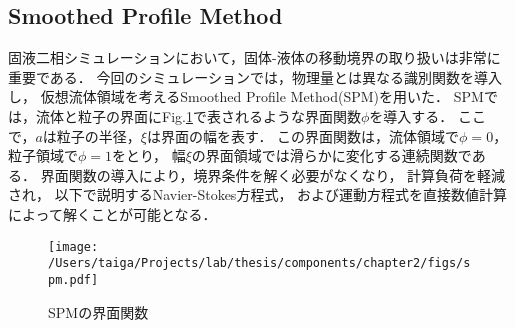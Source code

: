 \subsection{Smoothed Profile Method}
固液二相シミュレーションにおいて，固体-液体の移動境界の取り扱いは非常に重要である．
今回のシミュレーションでは，物理量とは異なる識別関数を導入し，
仮想流体領域を考えるSmoothed Profile Method(SPM)\cite{}を用いた．
SPMでは，流体と粒子の界面にFig.\ref{fig:spm}で表されるような界面関数$\phi$を導入する．
ここで，$a$は粒子の半径，$\xi$は界面の幅を表す．
この界面関数は，流体領域で$\phi=0$，粒子領域で$\phi=1$をとり，
幅$\xi$の界面領域では滑らかに変化する連続関数である．
界面関数の導入により，境界条件を解く必要がなくなり，
計算負荷を軽減され，
以下で説明するNavier-Stokes方程式，
および運動方程式を直接数値計算によって解くことが可能となる．

    \begin{figure}[H]
        \centering
        \texttt{[image: /Users/taiga/Projects/lab/thesis/components/chapter2/figs/spm.pdf]}
        \caption{SPMの界面関数}
        \label{fig:spm}
    \end{figure}

